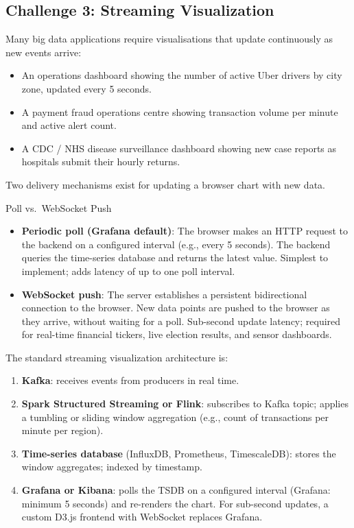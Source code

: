 \subsection{Challenge 3: Streaming Visualization}
\label{subsec:streaming-viz}

Many big data applications require visualisations that update
continuously as new events arrive:
\begin{itemize}
  \item An operations dashboard showing the number of active Uber
        drivers by city zone, updated every 5 seconds.
  \item A payment fraud operations centre showing transaction volume
        per minute and active alert count.
  \item A CDC / NHS disease surveillance dashboard showing new case
        reports as hospitals submit their hourly returns.
\end{itemize}

Two delivery mechanisms exist for updating a browser chart with new data.

\begin{defbox}{Poll vs.\ WebSocket Push}
\begin{itemize}
  \item \textbf{Periodic poll (Grafana default)}: The browser makes
        an HTTP request to the backend on a configured interval
        (e.g., every 5 seconds). The backend queries the time-series
        database and returns the latest value. Simplest to implement;
        adds latency of up to one poll interval.
  \item \textbf{WebSocket push}: The server establishes a persistent
        bidirectional connection to the browser. New data points are
        pushed to the browser as they arrive, without waiting for a
        poll. Sub-second update latency; required for real-time financial
        tickers, live election results, and sensor dashboards.
\end{itemize}
\end{defbox}

The standard streaming visualization architecture is:
\begin{enumerate}
  \item \textbf{Kafka}: receives events from producers in real time.
  \item \textbf{Spark Structured Streaming or Flink}: subscribes to
        Kafka topic; applies a tumbling or sliding window aggregation
        (e.g., count of transactions per minute per region).
  \item \textbf{Time-series database} (InfluxDB, Prometheus, TimescaleDB):
        stores the window aggregates; indexed by timestamp.
  \item \textbf{Grafana or Kibana}: polls the TSDB on a configured
        interval (Grafana: minimum 5 seconds) and re-renders the chart.
        For sub-second updates, a custom D3.js frontend with WebSocket
        replaces Grafana.
\end{enumerate}

